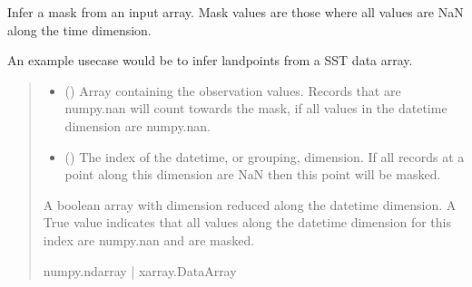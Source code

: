 \documentclass[letterpaper,10pt,english]{sphinxmanual}
\begin{document}
\begin{fulllineitems}
\label{\detokenize{misc:glomar_gridding.mask.mask_from_obs_array}}
\pysigstartsignatures
\pysiglinewithargsret
{}
{\sphinxparamcomma {}}
{}
\pysigstopsignatures
\sphinxAtStartPar
Infer a mask from an input array. Mask values are those where all values
are NaN along the time dimension.

\sphinxAtStartPar
An example use\sphinxhyphen{}case would be to infer land\sphinxhyphen{}points from a SST data array.
\begin{quote}\begin{description}
\begin{itemize}
\item {}
\sphinxAtStartPar
{} () \textendash{} Array containing the observation values. Records that are numpy.nan
will count towards the mask, if all values in the datetime dimension
are numpy.nan.

\item {}
\sphinxAtStartPar
{} () \textendash{} The index of the datetime, or grouping, dimension. If all records at
a point along this dimension are NaN then this point will be masked.

\end{itemize}

\sphinxAtStartPar
{} \textendash{} A boolean array with dimension reduced along the datetime dimension.
A True value indicates that all values along the datetime dimension
for this index are numpy.nan and are masked.

\sphinxAtStartPar
numpy.ndarray | xarray.DataArray

\end{description}\end{quote}

\end{fulllineitems}

\end{document}
